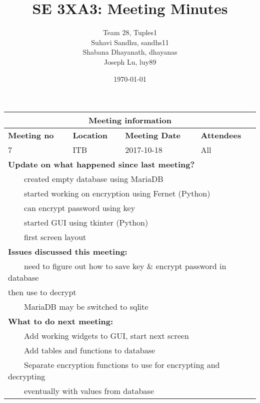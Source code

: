 \documentclass{article}
\title{SE 3XA3: Meeting Minutes}
\author{Team 28, Tuples1
		\\ Suhavi Sandhu, sandhs11
		\\ Shabana Dhayanath, dhayanas
		\\ Joseph Lu, luy89
}
\date{\today}
\newcommand{\tabitem}{~~\llap{\textbullet}~~}
\begin{document}
\begin{tabularx}{\textwidth}{| X || X || X || X |}
    \hline
    \hline
    \multicolumn{4}{|c|}{\textbf{Meeting information}}\\
    \hline
    \hline
        
    \textbf{Meeting no}& \textbf{Location}&\textbf{Meeting Date}&\textbf{Attendees}\\
    
    \hline

    7 & ITB & 2017-10-18 & All\\
    
    \hline

    \multicolumn{4}{|l|}{\textbf{Update on what happened since last meeting?}}\\

    \multicolumn{4}{|l|}{\tabitem created empty database using MariaDB}\\
    \multicolumn{4}{|l|}{\tabitem started working on encryption using Fernet (Python)}\\
        \multicolumn{4}{|l|}{\quad\tabitem can encrypt password using key}\\
    \multicolumn{4}{|l|}{\tabitem started GUI using tkinter (Python)}\\
        \multicolumn{4}{|l|}{\quad\tabitem first screen layout}\\

    \hline

    \multicolumn{4}{|l|}{\textbf{Issues discussed this meeting:}}\\
    
    \multicolumn{4}{|l|}{\tabitem need to figure out how to save key \& encrypt password in database}\\
    \multicolumn{4}{|l|}{then use to decrypt}\\
    \multicolumn{4}{|l|}{\tabitem MariaDB may be switched to sqlite}\\

    \hline

    \multicolumn{4}{|l|}{\textbf{What to do next meeting:}}\\

    \multicolumn{4}{|l|}{\tabitem Add working widgets to GUI, start next screen}\\
    \multicolumn{4}{|l|}{\tabitem Add tables and functions to database}\\
    \multicolumn{4}{|l|}{\tabitem Separate encryption functions to use for encrypting and decrypting}\\
        \multicolumn{4}{|l|}{\quad\tabitem eventually with values from database}\\


\end{tabularx}
\end{document}
